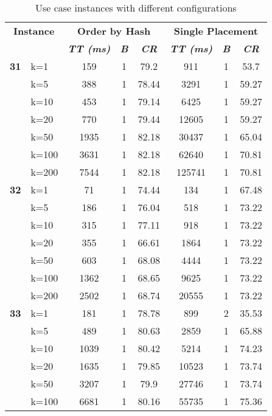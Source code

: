 \begin{table}[htbp]
    \caption{Use case instances with different configurations}
    \begin{tabular}{ll|ccc|ccc}
    
    \multicolumn{ 2}{c|}{\textbf{Instance}} & \multicolumn{ 3}{c|}{\textbf{Order by Hash}} & \multicolumn{ 3}{c}{\textbf{Single Placement}} \\ 
    \multicolumn{ 2}{l|}{} & \textbf{\textit{TT (ms)}} & \textbf{\textit{B}} & \textbf{\textit{CR}} & \textbf{\textit{TT (ms)}} & \textbf{\textit{B}} & \textbf{\textit{CR}} \\ \hline
    \multicolumn{1}{r}{\textbf{31}} & k=1 & 159 & 1 & 79.2 & 911 & 1 & 53.7 \\ 
     & k=5 & 388 & 1 & 78.44 & 3291 & 1 & 59.27 \\ 
     & k=10 & 453 & 1 & 79.14 & 6425 & 1 & 59.27 \\ 
     & k=20 & 770 & 1 & 79.44 & 12605 & 1 & 59.27 \\ 
     & k=50 & 1935 & 1 & 82.18 & 30437 & 1 & 65.04 \\ 
     & k=100 & 3631 & 1 & 82.18 & 62640 & 1 & 70.81 \\ 
     & k=200 & 7544 & 1 & 82.18 & 125741 & 1 & 70.81 \\ \hline
    \multicolumn{1}{r}{\textbf{32}} & k=1 & 71 & 1 & 74.44 & 134 & 1 & 67.48 \\ 
     & k=5 & 186 & 1 & 76.04 & 518 & 1 & 73.22 \\ 
     & k=10 & 315 & 1 & 77.11 & 918 & 1 & 73.22 \\ 
     & k=20 & 355 & 1 & 66.61 & 1864 & 1 & 73.22 \\ 
     & k=50 & 603 & 1 & 68.08 & 4444 & 1 & 73.22 \\ 
     & k=100 & 1362 & 1 & 68.65 & 9625 & 1 & 73.22 \\ 
     & k=200 & 2502 & 1 & 68.74 & 20555 & 1 & 73.22 \\ \hline
    \multicolumn{1}{r}{\textbf{33}} & k=1 & 181 & 1 & 78.78 & 899 & 2 & 35.53 \\ 
     & k=5 & 489 & 1 & 80.63 & 2859 & 1 & 65.88 \\ 
     & k=10 & 1039 & 1 & 80.42 & 5214 & 1 & 74.23 \\ 
     & k=20 & 1635 & 1 & 79.85 & 10523 & 1 & 73.74 \\ 
     & k=50 & 3207 & 1 & 79.9 & 27746 & 1 & 73.74 \\ 
     & k=100 & 6681 & 1 & 80.16 & 55735 & 1 & 75.36 \\ 

\end{tabular}
\end{table}
